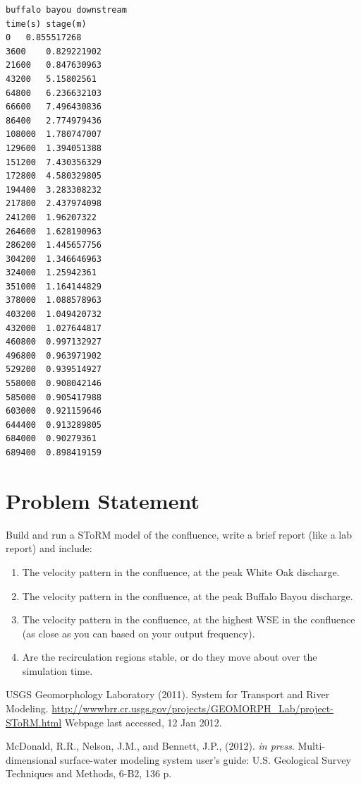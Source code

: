 \documentclass[12pt]{article}
\begin{document}
\begin{verbatim}
buffalo bayou downstream
time(s)	stage(m)
0	0.855517268
3600	0.829221902
21600	0.847630963
43200	5.15802561
64800	6.236632103
66600	7.496430836
86400	2.774979436
108000	1.780747007
129600	1.394051388
151200	7.430356329
172800	4.580329805
194400	3.283308232
217800	2.437974098
241200	1.96207322
264600	1.628190963
286200	1.445657756
304200	1.346646963
324000	1.25942361
351000	1.164144829
378000	1.088578963
403200	1.049420732
432000	1.027644817
460800	0.997132927
496800	0.963971902
529200	0.939514927
558000	0.908042146
585000	0.905417988
603000	0.921159646
644400	0.913289805
684000	0.90279361
689400	0.898419159
\end{verbatim}

\section*{{Problem Statement}}
Build and run a SToRM model of the confluence, write a brief report (like a lab report) and include:
\begin{enumerate}
\item The velocity pattern in the confluence, at the peak White Oak discharge.
\item The velocity pattern in the confluence, at the peak Buffalo Bayou discharge.
\item The velocity pattern in the confluence, at the highest WSE in the confluence (as close as you can based on your output frequency).
\item Are the recirculation regions stable, or do they move about over the simulation time.
\end{enumerate}

\begin{thebibliography}{}

{USGS Geomorphology Laboratory} (2011).
\newblock System for Transport and River Modeling.   
\url{http://wwwbrr.cr.usgs.gov/projects/GEOMORPH_Lab/project-SToRM.html} Webpage last accessed, 12 Jan 2012.

{McDonald, R.R., Nelson, J.M., and Bennett, J.P.}, (2012).  
\textsl{in press}. Multi-dimensional surface-water modeling system user's guide: U.S. Geological Survey Techniques and Methods, 6-B2, 136 p.



\end{thebibliography}
\end{document}
